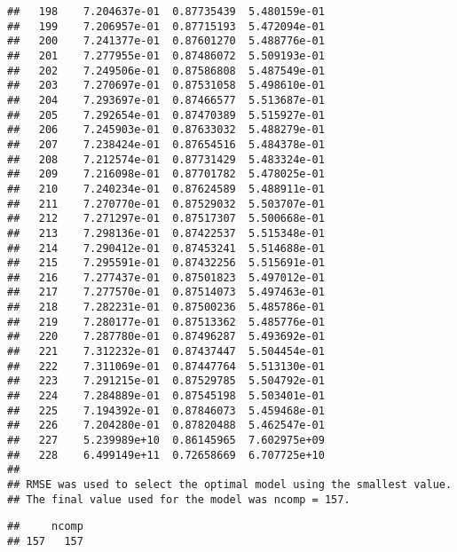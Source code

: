\documentclass[]{article}
\newenvironment{Shaded}{\begin{snugshade}}{\end{snugshade}}
\newcommand{\CommentTok}[1]{\textcolor[rgb]{0.56,0.35,0.01}{\textit{#1}}}
\newcommand{\KeywordTok}[1]{\textcolor[rgb]{0.13,0.29,0.53}{\textbf{#1}}}
\newcommand{\NormalTok}[1]{#1}
\newcommand{\OperatorTok}[1]{\textcolor[rgb]{0.81,0.36,0.00}{\textbf{#1}}}
\newcommand{\StringTok}[1]{\textcolor[rgb]{0.31,0.60,0.02}{#1}}
\begin{document}
\begin{verbatim}
##   198    7.204637e-01  0.87735439  5.480159e-01
##   199    7.206957e-01  0.87715193  5.472094e-01
##   200    7.241377e-01  0.87601270  5.488776e-01
##   201    7.277955e-01  0.87486072  5.509193e-01
##   202    7.249506e-01  0.87586808  5.487549e-01
##   203    7.270697e-01  0.87531058  5.498610e-01
##   204    7.293697e-01  0.87466577  5.513687e-01
##   205    7.292654e-01  0.87470389  5.515927e-01
##   206    7.245903e-01  0.87633032  5.488279e-01
##   207    7.238424e-01  0.87654516  5.484378e-01
##   208    7.212574e-01  0.87731429  5.483324e-01
##   209    7.216098e-01  0.87701782  5.478025e-01
##   210    7.240234e-01  0.87624589  5.488911e-01
##   211    7.270770e-01  0.87529032  5.503707e-01
##   212    7.271297e-01  0.87517307  5.500668e-01
##   213    7.298136e-01  0.87422537  5.515348e-01
##   214    7.290412e-01  0.87453241  5.514688e-01
##   215    7.295591e-01  0.87432256  5.515691e-01
##   216    7.277437e-01  0.87501823  5.497012e-01
##   217    7.277570e-01  0.87514073  5.497463e-01
##   218    7.282231e-01  0.87500236  5.485786e-01
##   219    7.280177e-01  0.87513362  5.485776e-01
##   220    7.287780e-01  0.87496287  5.493692e-01
##   221    7.312232e-01  0.87437447  5.504454e-01
##   222    7.311069e-01  0.87447764  5.513130e-01
##   223    7.291215e-01  0.87529785  5.504792e-01
##   224    7.284889e-01  0.87545198  5.503401e-01
##   225    7.194392e-01  0.87846073  5.459468e-01
##   226    7.204280e-01  0.87820488  5.462547e-01
##   227    5.239989e+10  0.86145965  7.602975e+09
##   228    6.499149e+11  0.72658669  6.707725e+10
## 
## RMSE was used to select the optimal model using the smallest value.
## The final value used for the model was ncomp = 157.
\end{verbatim}

\begin{Shaded}
\end{Shaded}

\begin{verbatim}
##     ncomp
## 157   157
\end{verbatim}

\begin{Shaded}
\end{Shaded}
\end{document}
